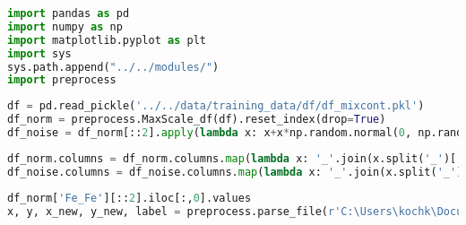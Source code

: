 \begin{lstlisting}[language=Python]
import pandas as pd
import numpy as np
import matplotlib.pyplot as plt
import sys
sys.path.append("../../modules/")
import preprocess
\end{lstlisting}

\begin{lstlisting}[language=Python]
df = pd.read_pickle('../../data/training_data/df/df_mixcont.pkl') 
df_norm = preprocess.MaxScale_df(df).reset_index(drop=True)
df_noise = df_norm[::2].apply(lambda x: x+x*np.random.normal(0, np.random.randint(1,3)*0.01 , len(x)))
\end{lstlisting}

\begin{lstlisting}[language=Python]
df_norm.columns = df_norm.columns.map(lambda x: '_'.join(x.split('_')[:2]))
df_noise.columns = df_noise.columns.map(lambda x: '_'.join(x.split('_')[:2]))
\end{lstlisting}

\begin{lstlisting}[language=Python]
df_norm['Fe_Fe'][::2].iloc[:,0].values
x, y, x_new, y_new, label = preprocess.parse_file(r'C:\Users\kochk\Documents\Git_Repos\Github\deep_xps\data\test_data\Selected_Spectra\elemental\Fe_Fe_Fe, iron, ion etched, Reference Grade spectra.VMS', filetype='vms', scale=True, energy='kinetic', N_points=1024)
\end{lstlisting}

